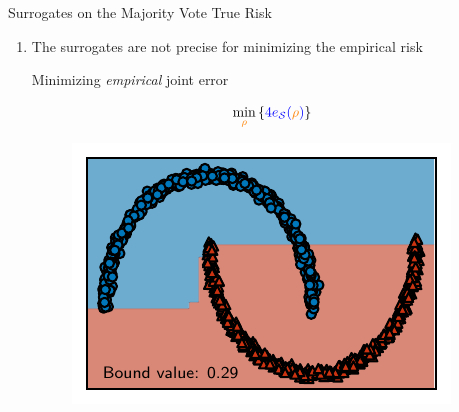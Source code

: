\documentclass{slides}
\begin{document}
\begin{xframe}{Surrogates on the Majority Vote True Risk}

\begin{enumerate}
    \item The surrogates are not precise for minimizing the empirical risk\\
    \begin{minipage}{0.50\linewidth}
        \begin{center}
        Minimizing {\it empirical} joint error
        \end{center}
        \begin{align*}
        \min_{\textcolor{orange}{\rho}} \left\{ \textcolor{blue}{4e_{\mathcal{S}}(\textcolor{orange}{\rho})} \right\}
        \end{align*}
    \end{minipage}
    \hfill
    \begin{minipage}{0.49\linewidth}
    \begin{figure}
        \centering
        \includegraphics[width=0.7\linewidth]{figures/moons_risk.pdf}
    \end{figure}
    \end{minipage}


\end{enumerate}
\end{xframe}
\end{document}

